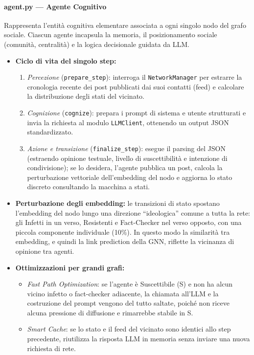 \documentclass[11pt, a4paper]{article}
\begin{document}
\paragraph{agent.py — Agente Cognitivo}
Rappresenta l'entità cognitiva elementare associata a ogni singolo nodo del grafo sociale. Ciascun agente incapsula la memoria, il posizionamento sociale (comunità, centralità) e la logica decisionale guidata da LLM.

\begin{itemize}[leftmargin=*]
    \item \textbf{Ciclo di vita del singolo step:}
    \begin{enumerate}
        \item \textit{Percezione} (\texttt{prepare\_step}): interroga il \texttt{NetworkManager} per estrarre la cronologia recente dei post pubblicati dai suoi contatti (feed) e calcolare la distribuzione degli stati del vicinato.
        \item \textit{Cognizione} (\texttt{cognize}): prepara i prompt di sistema e utente strutturati e invia la richiesta al modulo \texttt{LLMClient}, ottenendo un output JSON standardizzato.
        \item \textit{Azione e transizione} (\texttt{finalize\_step}): esegue il parsing del JSON (estraendo opinione testuale, livello di suscettibilità e intenzione di condivisione); se lo desidera, l'agente pubblica un post, calcola la perturbazione vettoriale dell'embedding del nodo e aggiorna lo stato discreto consultando la macchina a stati.
    \end{enumerate}
    \item \textbf{Perturbazione degli embedding:} le transizioni di stato spostano l'embedding del nodo lungo una direzione ``ideologica'' comune a tutta la rete: gli Infetti in un verso, Resistenti e Fact-Checker nel verso opposto, con una piccola componente individuale (10\%). In questo modo la similarità tra embedding, e quindi la link prediction della GNN, riflette la vicinanza di opinione tra agenti.
    \item \textbf{Ottimizzazioni per grandi grafi:}
    \begin{itemize}
        \item \textit{Fast Path Optimization}: se l'agente è Suscettibile (S) e non ha alcun vicino infetto o fact-checker adiacente, la chiamata all'LLM e la costruzione del prompt vengono del tutto saltate, poiché non riceve alcuna pressione di diffusione e rimarrebbe stabile in S.
        \item \textit{Smart Cache}: se lo stato e il feed del vicinato sono identici allo step precedente, riutilizza la risposta LLM in memoria senza inviare una nuova richiesta di rete.
    \end{itemize}
\end{itemize}
\end{document}
